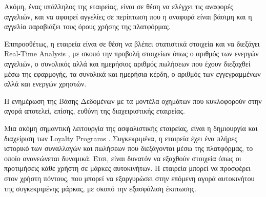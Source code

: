 \documentclass{../ol-softwaremanual}
\begin{document}
	Ακόμη, ένας υπάλληλος της εταιρείας, είναι σε θέση να ελέγχει τις αναφορές αγγελιών, και να αφαιρεί αγγελίες σε περίπτωση που η αναφορά είναι βάσιμη και η αγγελία παραβιάζει τους όρους χρήσης της πλατφόρμας. \break
	
	Επιπροσθέτως, η εταιρεία είναι σε θέση να βλέπει στατιστικά στοιχεία και να διεξάγει \en Real-Time Analysis \gr, με σκοπό την προβολή στοιχείων όπως ο αριθμός των ενεργών αγγελιών, ο συνολικός αλλά και ημερήσιος αριθμός πωλήσεων που έχουν διεξαχθεί μέσω της εφαρμογής, τα συνολικά και ημερήσια κέρδη, ο αριθμός των εγγεγραμμένων αλλά και ενεργών χρηστών. \break 
	
	Η ενημέρωση της Βάσης Δεδομένων με τα μοντέλα οχημάτων που κυκλοφορούν στην αγορά αποτελεί, επίσης, ευθύνη της διαχειριστικής εταιρείας. \break
	
	Μια ακόμη σημαντική λειτουργία της ασφαλιστικής εταιρείας, είναι η δημιουργία και διαχείριση των \en Loyalty Programs \gr. Συγκεκριμένα, η εταιρεία έχει ένα πλήρες ιστορικό των συναλλαγών και πωλήσεων που διεξάγονται μέσω της πλατφόρμας, το οποίο ανανεώνεται δυναμικά. Έτσι, είναι δυνατόν να εξαχθούν στοιχεία όπως οι προτιμήσεις κάθε χρήστη σε μάρκες αυτοκινήτων. Η εταιρεία μπορεί να προσφέρει στον χρήστη πόντους, που μπορεί να εξαργυρώσει στην επόμενη αγορά αυτοκινήτου της συγκεκριμένης μάρκας, με σκοπό την εξασφάλιση έκπτωσης. \break 
	
	
	
	\newpage
	
	 \gr
	
	
	
\end{document}

